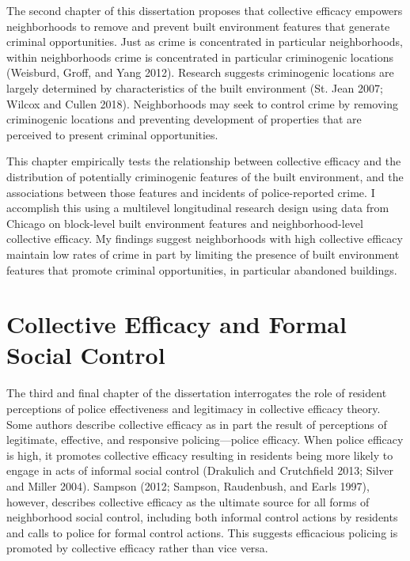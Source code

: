 \documentclass [11pt, proquest] {uwthesis}[2015/03/03]
\begin{document}
The second chapter of this dissertation proposes that collective efficacy empowers neighborhoods to remove and prevent built environment features that generate criminal opportunities. Just as crime is concentrated in particular neighborhoods, within neighborhoods crime is concentrated in particular criminogenic locations (Weisburd, Groff, and Yang 2012). Research suggests criminogenic locations are largely determined by characteristics of the built environment (St. Jean 2007; Wilcox and Cullen 2018). Neighborhoods may seek to control crime by removing criminogenic locations and preventing development of properties that are perceived to present criminal opportunities.

This chapter empirically tests the relationship between collective efficacy and the distribution of potentially criminogenic features of the built environment, and the associations between those features and incidents of police-reported crime. I accomplish this using a multilevel longitudinal research design using data from Chicago on block-level built environment features and neighborhood-level collective efficacy. My findings suggest neighborhoods with high collective efficacy maintain low rates of crime in part by limiting the presence of built environment features that promote criminal opportunities, in particular abandoned buildings.

\hypertarget{collective-efficacy-and-formal-social-control}{%
\section{Collective Efficacy and Formal Social Control}\label{collective-efficacy-and-formal-social-control}}

The third and final chapter of the dissertation interrogates the role of resident perceptions of police effectiveness and legitimacy in collective efficacy theory. Some authors describe collective efficacy as in part the result of perceptions of legitimate, effective, and responsive policing---police efficacy. When police efficacy is high, it promotes collective efficacy resulting in residents being more likely to engage in acts of informal social control (Drakulich and Crutchfield 2013; Silver and Miller 2004). Sampson (2012; Sampson, Raudenbush, and Earls 1997), however, describes collective efficacy as the ultimate source for all forms of neighborhood social control, including both informal control actions by residents and calls to police for formal control actions. This suggests efficacious policing is promoted by collective efficacy rather than vice versa.
\end{document}
